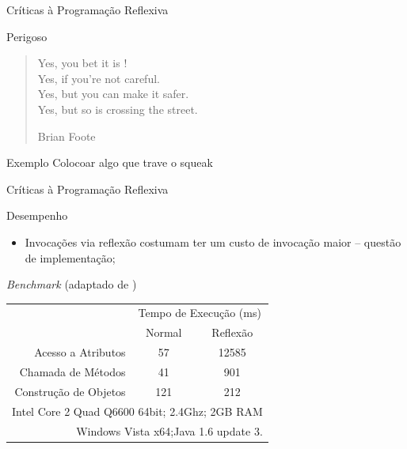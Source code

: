 \documentclass[12pt,t]{beamer}
\begin{document}
 	 \begin{frame}{Críticas à Programação Reflexiva}
 	 	\begin{block}{Perigoso}
 	 		\begin{quote}
				Yes, you bet it is ! \\
				Yes, if you're not careful. \\
				Yes, but you can make it safer. \\
				Yes, but so is crossing the street.
 	 			\begin{flushright}
 	 				Brian Foote
 	 			\end{flushright}
 	 		\end{quote}
 	 	\end{block}
 	 	\pause
 	 	\begin{exampleblock}{Exemplo}
 	 		\alert{Colocoar algo que trave o squeak}
 	 	\end{exampleblock}
 	 \end{frame}
	 \begin{frame}{Críticas à Programação Reflexiva}
 	 	\begin{block}{Desempenho}
 	 		\begin{itemize}
 	 			\item Invocações via reflexão costumam ter um custo de invocação maior -- \alert{questão de implementação};
 	 		\end{itemize}
 	 	\end{block}
 	 	\pause
 	 	\begin{block}{\emph{Benchmark} (adaptado de )}
			\begin{table}[h]
				\begin{tabular}{rcc}
					& \multicolumn{2}{c}{Tempo de Execução (ms)} \\
					& Normal              & Reflexão             \\
					\hline \hline
					Acesso a Atributos    & 57                  & 12585                \\
					Chamada de Métodos    & 41                  & 901                  \\
					Construção de Objetos & 121                 & 212                  \\ \hline
					\multicolumn{3}{r}{\footnotesize{Intel Core 2 Quad Q6600 64bit; 2.4Ghz; 2GB RAM}}\\
					\multicolumn{3}{r}{\footnotesize{Windows Vista x64;Java 1.6 update 3.}}\\										
					\hline
				\end{tabular}
			\end{table} 	 
 	 	\end{block}
 	 \end{frame}
\end{document}
